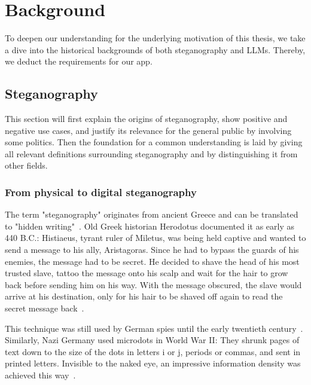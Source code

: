 
\chapter{Background}\label{ch:background}
\glsresetall %

To deepen our understanding for the underlying motivation of this thesis, we take a dive into the historical backgrounds of both steganography and \glspl{LLM}. Thereby, we deduct the requirements for our app.

\section{Steganography}
\label{sec:steganography}
This section will first explain the origins of steganography, show positive and negative use cases, and justify its relevance for the general public by involving some politics. Then the foundation for a common understanding is laid by giving all relevant definitions surrounding steganography and by distinguishing it from other fields.

\subsection{From physical to digital steganography}
\label{sec:fromPhysicalToDigitalSteganography}
The term "steganography" originates from ancient Greece and can be translated to "hidden writing"~\cite{kolataVeiledMessagesTerror2001,dembartEndUserHide2001}. Old Greek historian Herodotus documented it as early as 440 B.C.: Histiaeus, tyrant ruler of Miletus, was being held captive and wanted to send a message to his ally, Aristagoras. Since he had to bypass the guards of his enemies, the message had to be secret. He decided to shave the head of his most trusted slave, tattoo the message onto his scalp and wait for the hair to grow back before sending him on his way. With the message obscured, the slave would arrive at his destination, only for his hair to be shaved off again to read the secret message back~\cite{bennettLinguisticSteganographySurvey2004,petitcolasInformationHidingSurvey1999,dembartEndUserHide2001}.

This technique was still used by German spies until the early twentieth century~\cite{petitcolasInformationHidingSurvey1999}. Similarly, Nazi Germany used microdots in World War II: They shrunk pages of text down to the size of the dots in letters i or j, periods or commas, and sent in printed letters. Invisible to the naked eye, an impressive information density was achieved this way~\cite{dembartEndUserHide2001,petitcolasInformationHidingSurvey1999}.

